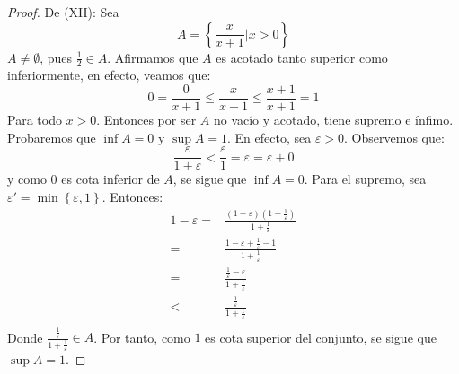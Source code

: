 \documentclass[12pt]{article}
\begin{document}
\begin{enumerate}
\begin{proof}
        De (XII): Sea
        \begin{equation*}
            A = \left\{\frac{x}{x+1}|x>0\right\}
        \end{equation*}
        $A\neq \emptyset$, pues $\frac{1}{2}\in A$. Afirmamos que $A$ es acotado tanto superior como inferiormente, en efecto, veamos que:
        \begin{equation*}
            0= \frac{0}{x+1}\leq \frac{x}{x+1}\leq \frac{x+1}{x+1}=1
        \end{equation*}
        Para todo $x>0$. Entonces por ser $A$ no vacío y acotado, tiene supremo e ínfimo. Probaremos que $\inf A = 0$ y $\sup A = 1$. En efecto, sea $\varepsilon > 0$. Observemos que:
        \begin{equation*}
            \frac{\varepsilon}{1+\varepsilon}< \frac{\varepsilon}{1}=\varepsilon=\varepsilon+0
        \end{equation*}
        y como $0$ es cota inferior de $A$, se sigue que $\inf A = 0$. Para el supremo, sea $\varepsilon'=\min\left\{\varepsilon,1\right\}$. Entonces:
        \begin{equation*}
            \begin{split}
                1-\varepsilon =& \frac{\left(1-\varepsilon\right)\left(1+\frac{1}{\varepsilon}\right)}{1+\frac{1}{\varepsilon}}\\
                =& \frac{1-\varepsilon+\frac{1}{\varepsilon}-1}{1+\frac{1}{\varepsilon}}\\
                =& \frac{\frac{1}{\varepsilon}-\varepsilon}{1+\frac{1}{\varepsilon}}\\
                <& \frac{\frac{1}{\varepsilon}}{1+\frac{1}{\varepsilon}}\\
            \end{split}
        \end{equation*}
        Donde $\frac{\frac{1}{\varepsilon}}{1+\frac{1}{\varepsilon}}\in A$. Por tanto, como $1$ es cota superior del conjunto, se sigue que $\sup A = 1$.


\end{proof}
\end{enumerate}
\end{document}
